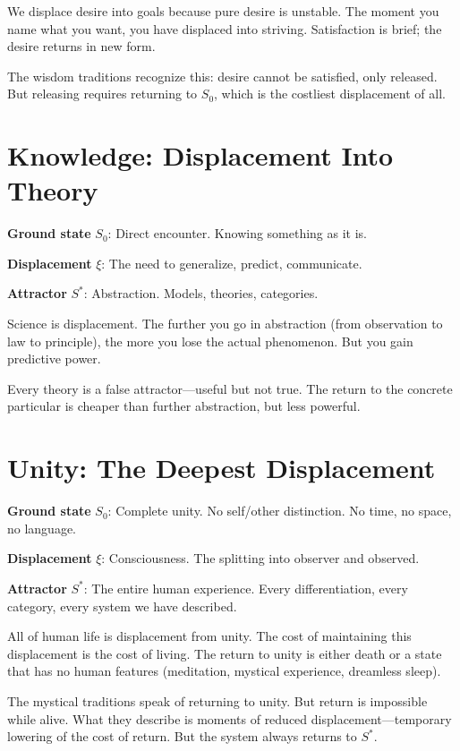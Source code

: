 \documentclass[12pt]{article}
\theoremstyle{definition}
\theoremstyle{remark}
\begin{document}
We displace desire into goals because pure desire is unstable. The moment you name what you want, you have displaced into striving. Satisfaction is brief; the desire returns in new form.

The wisdom traditions recognize this: desire cannot be satisfied, only released. But releasing requires returning to $S_0$, which is the costliest displacement of all.

\section{Knowledge: Displacement Into Theory}

\textbf{Ground state} $S_0$: Direct encounter. Knowing something as it is.

\textbf{Displacement} $\xi$: The need to generalize, predict, communicate.

\textbf{Attractor} $S^*$: Abstraction. Models, theories, categories.

Science is displacement. The further you go in abstraction (from observation to law to principle), the more you lose the actual phenomenon. But you gain predictive power.

Every theory is a false attractor—useful but not true. The return to the concrete particular is cheaper than further abstraction, but less powerful.

\section{Unity: The Deepest Displacement}

\textbf{Ground state} $S_0$: Complete unity. No self/other distinction. No time, no space, no language.

\textbf{Displacement} $\xi$: Consciousness. The splitting into observer and observed.

\textbf{Attractor} $S^*$: The entire human experience. Every differentiation, every category, every system we have described.

All of human life is displacement from unity. The cost of maintaining this displacement is the cost of living. The return to unity is either death or a state that has no human features (meditation, mystical experience, dreamless sleep).

The mystical traditions speak of returning to unity. But return is impossible while alive. What they describe is moments of reduced displacement—temporary lowering of the cost of return. But the system always returns to $S^*$.
\end{document}
